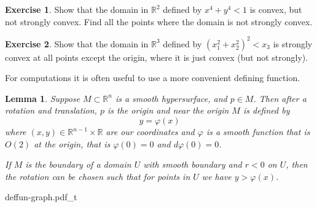 \documentclass[12pt,openany]{book}
\newcommand{\R}{{\mathbb{R}}}
\theoremstyle{plain}
\newtheorem{lemma}[thm]{Lemma}
\theoremstyle{remark}
\theoremstyle{definition}
\newenvironment{exbox}{%
    \def\FrameCommand{\vrule width 1pt \relax\hspace {10pt}}%
    \MakeFramed {\advance \hsize -\width \FrameRestore }%
}{%
    \endMakeFramed
}
\theoremstyle{exercise}
\newtheorem{exercise}{Exercise}[section]
\theoremstyle{example}
\begin{document}
\begin{exbox}
\begin{exercise}
Show that the domain in $\R^2$ defined by $x^4+y^4 < 1$ is convex, but not strongly convex.
Find all the points where the domain is not strongly convex.
\end{exercise}

\begin{exercise}
Show that the domain in $\R^3$ defined by ${(x_1^2+x_2^2)}^2 < x_3$ is
strongly convex at all points except the origin, where it is just convex
(but not strongly).
\end{exercise}
\end{exbox}

For computations it is often useful to use a more convenient
defining function.

\begin{lemma} \label{lemma:realgraphcoords}
Suppose $M \subset \R^n$ is a smooth hypersurface, %
and $p \in M$.  Then after a rotation and translation, 
$p$ is the origin and near the origin $M$ is defined by
\begin{equation*}
y = \varphi(x)
\end{equation*}
where $(x,y) \in \R^{n-1} \times \R$ are our coordinates and
$\varphi$ is a smooth %
function that is $O(2)$ at the origin,
that is $\varphi(0) = 0$ and $d\varphi(0) = 0$.

If $M$ is the boundary of a domain $U$ with smooth boundary and
$r < 0$ on $U$,
then the rotation can be chosen
such that for points in $U$ we have $y > \varphi(x)$.
\end{lemma}


\begin{center}
{deffun-graph.pdf_t}
\end{center}

\end{document}
